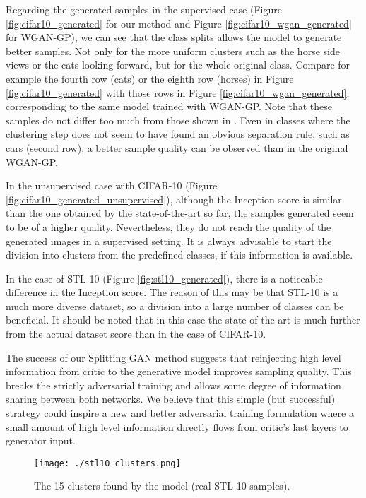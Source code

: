 \documentclass[times,twocolumn]{article}
\begin{document}
Regarding the generated samples in the supervised case (Figure \ref{fig:cifar10_generated} for our method and Figure \ref{fig:cifar10_wgan_generated} for WGAN-GP), we can see that the class splits allows the model to generate better samples. Not only for the more uniform clusters such as the horse side views or the cats looking forward, but for the whole original class. Compare for example the fourth row (cats) or the eighth row (horses) in Figure \ref{fig:cifar10_generated} with those rows in Figure \ref{fig:cifar10_wgan_generated}, corresponding to the same model trained with WGAN-GP.
Note that these samples do not differ too much from those shown in \cite{Gulrajani2017}. Even in classes where the clustering step does not seem to have found an obvious separation rule, such as cars (second row), a better sample quality can be observed than in the original WGAN-GP.

In the unsupervised case with CIFAR-10 (Figure \ref{fig:cifar10_generated_unsupervised}), although the Inception score is similar than the one obtained by the state-of-the-art so far, the samples generated seem to be of a higher quality. Nevertheless, they do not reach the quality of the generated images in a supervised setting. It is always advisable to start the division into clusters from the predefined classes, if this information is available.

In the case of STL-10 (Figure \ref{fig:stl10_generated}), there is a noticeable difference in the Inception score. The reason of this may be that STL-10 is a much more diverse dataset, so a division into a large number of classes can be beneficial. It should be noted that in this case the state-of-the-art is much further from the actual dataset score than in the case of CIFAR-10.

The success of our Splitting GAN method suggests that reinjecting high level information from critic to the generative model improves sampling quality. This breaks the strictly adversarial training and allows some degree of information sharing between both networks. We believe that this simple (but successful) strategy could inspire a new and better adversarial training formulation where a small amount of high level information directly flows from critic’s last layers to generator input.  



\begin{figure}
 \centering
 \texttt{[image: ./stl10\_clusters.png]}
\caption{The 15 clusters found by the model (real STL-10 samples).}
\label{fig:stl10_clusters}
\end{figure}
\end{document}
